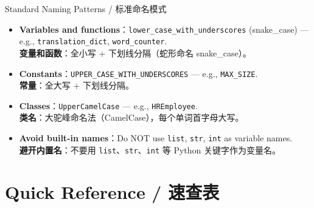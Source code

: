 \documentclass[11pt,a4paper]{report}
\let\oldtexttt\texttt
\renewcommand{\texttt}[1]{\textcolor{mainblue}{\oldtexttt{#1}}}
\begin{document}
\begin{concept}{Standard Naming Patterns / 标准命名模式}
    \begin{itemize}[itemsep=0.5em]
        \item \textbf{Variables and functions}：\texttt{lower\_case\_with\_underscores} (snake\_case) — e.g., \texttt{translation\_dict}, \texttt{word\_counter}. \\
        \textbf{变量和函数}：全小写 + 下划线分隔（蛇形命名 snake\_case）。
        \item \textbf{Constants}：\texttt{UPPER\_CASE\_WITH\_UNDERSCORES} — e.g., \texttt{MAX\_SIZE}. \\
        \textbf{常量}：全大写 + 下划线分隔。
        \item \textbf{Classes}：\texttt{UpperCamelCase} — e.g., \texttt{HREmployee}. \\
        \textbf{类名}：大驼峰命名法（CamelCase），每个单词首字母大写。
        \item \textbf{Avoid built-in names}：Do NOT use \texttt{list}, \texttt{str}, \texttt{int} as variable names. \\
        \textbf{避开内置名}：不要用 \texttt{list}、\texttt{str}、\texttt{int} 等 Python 关键字作为变量名。
    \end{itemize}
\end{concept}

\section{Quick Reference / 速查表}
\end{document}
